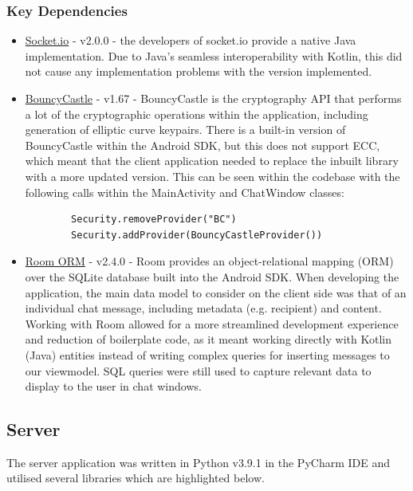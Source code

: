 \documentclass{mproj}
\begin{document}
\subsubsection{Key Dependencies}
\begin{itemize}
	\item \href{https://github.com/socketio/socket.io-client-java}{Socket.io} - v2.0.0 - the developers of socket.io provide a native Java implementation. Due to Java's seamless interoperability with Kotlin, this did not cause any implementation problems with the version implemented.
	\item \href{https://www.bouncycastle.org/}{BouncyCastle} - v1.67 - BouncyCastle is the cryptography API that performs a lot of the cryptographic operations within the application, including generation of elliptic curve keypairs. There is a built-in version of BouncyCastle within the Android SDK, but this does not support ECC, which meant that the client application needed to replace the inbuilt library with a more updated version. This can be seen within the codebase with the following calls within the MainActivity and ChatWindow classes:
		\begin{verbatim}
		Security.removeProvider("BC")
		Security.addProvider(BouncyCastleProvider())
		\end{verbatim}
	\item \href{https://developer.android.com/jetpack/androidx/releases/room}{Room ORM} - v2.4.0 - Room provides an object-relational mapping (ORM) over the SQLite database built into the Android SDK. When developing the application, the main data model to consider on the client side was that of an individual chat message, including metadata (e.g. recipient) and content. Working with Room allowed for a more streamlined development experience and reduction of boilerplate code, as it meant working directly with Kotlin (Java) entities instead of writing complex queries for inserting messages to our viewmodel. SQL queries were still used to capture relevant data to display to the user in chat windows. 

\end{itemize}

\subsection{Server}
The server application was written in Python v3.9.1 in the PyCharm IDE and utilised several libraries which are highlighted below. 
\end{document}
